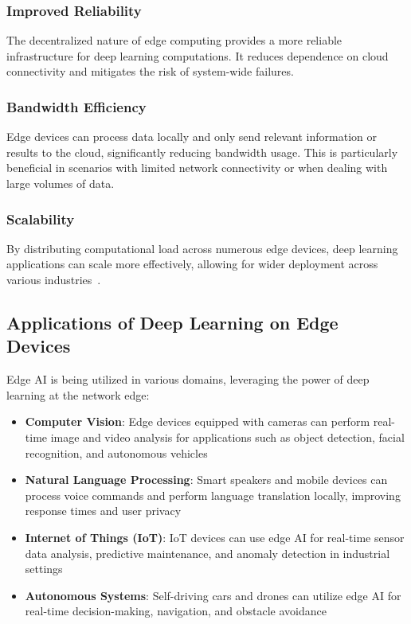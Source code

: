 \documentclass[9pt,a4paper,twoside]{rho-class/rho}
\begin{document}
\subsubsection{Improved Reliability}
The decentralized nature of edge computing provides a more reliable infrastructure for deep learning computations. It reduces dependence on cloud connectivity and mitigates the risk of system-wide failures.

\subsubsection{Bandwidth Efficiency}
Edge devices can process data locally and only send relevant information or results to the cloud, significantly reducing bandwidth usage. This is particularly beneficial in scenarios with limited network connectivity or when dealing with large volumes of data.

\subsubsection{Scalability}
By distributing computational load across numerous edge devices, deep learning applications can scale more effectively, allowing for wider deployment across various industries~\cite{chen2019deep}.

\subsection{Applications of Deep Learning on Edge Devices}
Edge AI is being utilized in various domains, leveraging the power of deep learning at the network edge:
\begin{itemize}
    \item \textbf{Computer Vision}: Edge devices equipped with cameras can perform real-time image and video analysis for applications such as object detection, facial recognition, and autonomous vehicles
    \item \textbf{Natural Language Processing}: Smart speakers and mobile devices can process voice commands and perform language translation locally, improving response times and user privacy
    \item \textbf{Internet of Things (IoT)}: IoT devices can use edge AI for real-time sensor data analysis, predictive maintenance, and anomaly detection in industrial settings
    \item \textbf{Autonomous Systems}: Self-driving cars and drones can utilize edge AI for real-time decision-making, navigation, and obstacle avoidance
\end{itemize}
\end{document}
